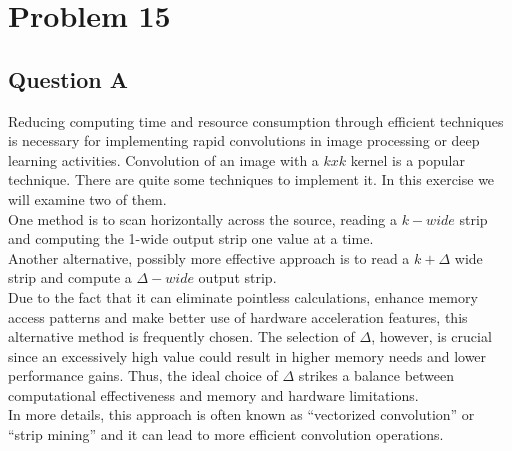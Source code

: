 \section{Problem 15}
\subsection{Question A}
Reducing computing time and resource consumption through efficient techniques is necessary for implementing rapid convolutions in image processing or deep learning activities. Convolution of an image with a $k x k$ kernel is a popular technique. There are quite some techniques to implement it. In this exercise we will examine two of them.\\
One method is to scan horizontally across the source, reading a $k-wide$ strip and computing
the 1-wide output strip one value at a time.\\
Another alternative, possibly more effective approach is to read a $k + \Delta$ wide strip
and compute a $\Delta-wide$ output strip. \\
Due to the fact that it can eliminate pointless calculations, enhance memory access patterns and make better use of hardware acceleration features, this alternative method is frequently chosen. The selection of $\Delta$, however, is crucial since an excessively high value could result in higher memory needs and lower performance gains. Thus, the ideal choice of $\Delta$ strikes a balance between computational effectiveness and memory and hardware limitations.
\\

In more details, this approach is often known as “vectorized convolution” or “strip mining” and it can lead to more efficient convolution operations.

